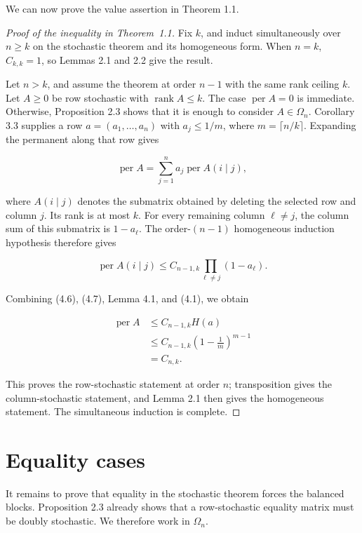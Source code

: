 \documentclass[11pt]{article}
\theoremstyle{remark}
\begin{document}
We can now prove the value assertion in Theorem 1.1.

\begin{proof}[Proof of the inequality in Theorem~1.1]
Fix \(k\), and induct
simultaneously over \(n\geq k\) on the stochastic theorem and its homogeneous
form. When \(n=k\), \(C_{k,k}=1\), so Lemmas 2.1 and 2.2 give the result.

Let \(n>k\), and assume the theorem at order \(n-1\) with the same rank
ceiling \(k\). Let \(A\geq0\) be row stochastic with
\(\operatorname{rank}A\leq k\). The case \(\operatorname{per}A=0\) is
immediate. Otherwise, Proposition 2.3 shows that it is enough to consider
\(A\in\Omega_n\). Corollary 3.3 supplies a row
\(a=(a_1,\ldots,a_n)\) with \(a_j\leq1/m\), where
\(m=\lceil n/k\rceil\). Expanding the permanent along that row gives

\[
 \operatorname{per}A
 =\sum_{j=1}^n a_j\operatorname{per}A(i\mid j),             \tag{4.6}
\]

where \(A(i\mid j)\) denotes the submatrix obtained by deleting the selected
row and column \(j\). Its rank is at most \(k\). For every remaining
column \(\ell\ne j\), the column sum of this submatrix is \(1-a_\ell\). The
order-\((n-1)\) homogeneous induction hypothesis therefore gives

\[
 \operatorname{per}A(i\mid j)
 \leq C_{n-1,k}\prod_{\ell\ne j}(1-a_\ell).                \tag{4.7}
\]

Combining (4.6), (4.7), Lemma 4.1, and (4.1), we obtain

\[
 \begin{aligned}
 \operatorname{per}A
 &\leq C_{n-1,k}H(a)\\
 &\leq C_{n-1,k}\left(1-\frac1m\right)^{m-1}\\
 &=C_{n,k}.
 \end{aligned}                                             \tag{4.8}
\]

This proves the row-stochastic statement at order \(n\); transposition gives
the column-stochastic statement, and Lemma 2.1 then gives the homogeneous
statement. The simultaneous induction is complete.
\end{proof}

\section{Equality cases}

It remains to prove that equality in the stochastic theorem forces the
balanced blocks. Proposition 2.3 already shows that a row-stochastic equality
matrix must be doubly stochastic. We therefore work in \(\Omega_n\).
\end{document}
